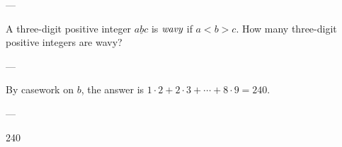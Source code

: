 
---

A three-digit positive integer $\underline{abc}$ is $\emph{wavy}$ if $a<b>c$. How many three-digit positive integers are wavy?

---

By casework on $b$, the answer is $1\cdot2+2\cdot3+\cdots+8\cdot9=240$.

---

240

